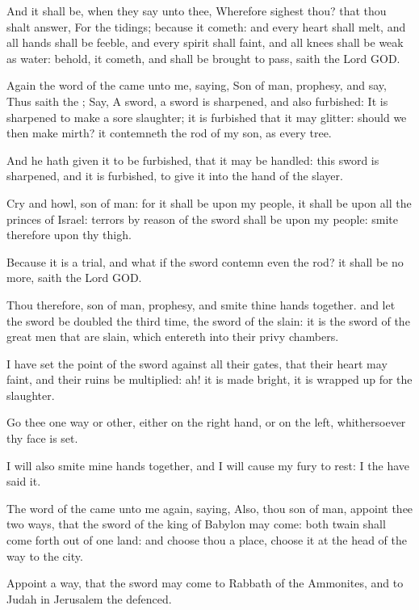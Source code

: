 \Verse And it shall be, when they say unto thee, Wherefore sighest thou?  that thou shalt answer, For the tidings; because it cometh: and every heart shall melt, and all hands shall be feeble, and every spirit shall faint, and all knees shall be weak as water: behold, it cometh, and shall be brought to pass, saith the Lord GOD.

\Verse Again the word of the \LORD came unto me, saying, \Verse Son of man, prophesy, and say, Thus saith the \LORD; Say, A sword, a sword is sharpened, and also furbished: \Verse It is sharpened to make a sore slaughter; it is furbished that it may glitter: should we then make mirth? it contemneth the rod of my son, as every tree.

\Verse And he hath given it to be furbished, that it may be handled: this sword is sharpened, and it is furbished, to give it into the hand of the slayer.

\Verse Cry and howl, son of man: for it shall be upon my people, it shall be upon all the princes of Israel: terrors by reason of the sword shall be upon my people: smite therefore upon thy thigh.

\Verse Because it is a trial, and what if the sword contemn even the rod?  it shall be no more, saith the Lord GOD.

\Verse Thou therefore, son of man, prophesy, and smite thine hands together. and let the sword be doubled the third time, the sword of the slain: it is the sword of the great men that are slain, which entereth into their privy chambers.

\Verse I have set the point of the sword against all their gates, that their heart may faint, and their ruins be multiplied: ah! it is made bright, it is wrapped up for the slaughter.

\Verse Go thee one way or other, either on the right hand, or on the left, whithersoever thy face is set.

\Verse I will also smite mine hands together, and I will cause my fury to rest: I the \LORD have said it.

\Verse The word of the \LORD came unto me again, saying, \Verse Also, thou son of man, appoint thee two ways, that the sword of the king of Babylon may come: both twain shall come forth out of one land: and choose thou a place, choose it at the head of the way to the city.

\Verse Appoint a way, that the sword may come to Rabbath of the Ammonites, and to Judah in Jerusalem the defenced.


